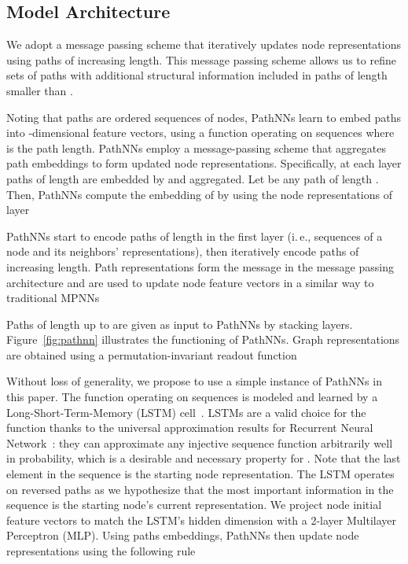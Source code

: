 \documentclass{article}
\theoremstyle{plain}
\theoremstyle{definition}
\theoremstyle{remark}
\newcommand{\ie}{i.\,e., }
\begin{document}
\subsection{Model Architecture} \label{sec:ModelArchitecture}

\begin{figure*}[t!]
    \centering
    \vfill
    \caption{Aggregation process of PathNN with  for two iterations. Node colors corresponds to node feature vectors.}
    \label{fig:pathnn}
\end{figure*}

We adopt a message passing scheme that iteratively updates node representations using paths of increasing length.
This message passing scheme allows us to refine sets of paths with additional structural information included in paths of length smaller than .


Noting that paths are ordered sequences of nodes, PathNNs learn to embed paths into -dimensional feature vectors, using a function operating on sequences  where  is the path length.
PathNNs employ a message-passing scheme that aggregates path embeddings to form updated node representations.
Specifically, at each layer  paths of length  are embedded by  and aggregated.
Let  be any path of length .
Then, PathNNs compute the embedding of  by using the node representations of layer~ 

PathNNs start to encode paths of length  in the first layer (\ie sequences of a node and its neighbors' representations), then iteratively encode paths of increasing length.
Path representations form the message in the message passing architecture and are used to update node feature vectors in a similar way to traditional MPNNs 
 
Paths of length up to  are given as input to PathNNs by stacking  layers.
Figure~\ref{fig:pathnn} illustrates the functioning of PathNNs. 
Graph representations are obtained using a permutation-invariant readout function

Without loss of generality, we propose to use a simple instance of PathNNs in this paper.
The function  operating on sequences is modeled and learned by a Long-Short-Term-Memory (LSTM) cell~\cite{hochreiter1997long}.
LSTMs are a valid choice for the function  thanks to the universal approximation results for Recurrent Neural Network~\cite{hammer2000approximation}: they can approximate any injective sequence function arbitrarily well in probability, which is a desirable and necessary property for .
Note that the last element in the sequence is the starting node representation.
The LSTM operates on reversed paths as we hypothesize that the most important information in the sequence is the starting node's current representation.
We project node initial feature vectors to match the LSTM's hidden dimension with a 2-layer Multilayer Perceptron (MLP).
Using paths embeddings, PathNNs then update node representations using the following rule 
\end{document}
